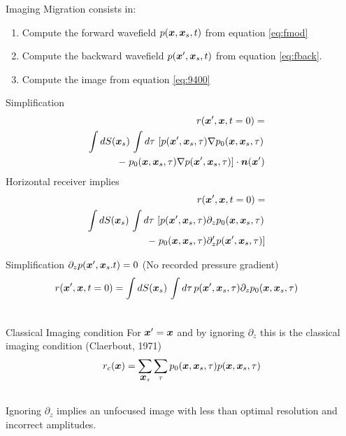 \documentclass[xcolor=dvipsnames,notes]{beamer}
\begin{document}
\begin{frame}{Imaging}
Migration consists in:
\begin{enumerate}
\item Compute the forward wavefield $p(\mbox{\boldmath $x$},\mbox{\boldmath $x$}_s,t)$
      from equation \eqref{eq:fmod}
\item Compute the backward wavefield $p(\mbox{\boldmath $x$}',\mbox{\boldmath $x$}_s,t)$ from equation \eqref{eq:fback}.
\item Compute the image from equation \eqref{eq:9400}
\end{enumerate}
\end{frame}
\begin{frame}{Simplification}
\begin{eqnarray}
 r(\mbox{\boldmath $x$}',\mbox{\boldmath $x$},t=0)=\nonumber\\
\int dS(\mbox{\boldmath $x$}_s)\, \int d\tau\, \left[p(\mbox{\boldmath $x$}',\mbox{\boldmath $x$}_s,\tau)\nabla p_0(\mbox{\boldmath $x$},\mbox{\boldmath $x$}_s,\tau)\right.\nonumber\\
   -\left. p_0(\mbox{\boldmath $x$},\mbox{\boldmath $x$}_s,\tau)\nabla p(\mbox{\boldmath $x$}',\mbox{\boldmath $x$}_s,\tau)\right]\cdot \mbox{\boldmath $n$}(\mbox{\boldmath $x$}')
&&                   \label{eq:10400}
\end{eqnarray}
Horizontal receiver implies
\begin{eqnarray}
 r(\mbox{\boldmath $x$}',\mbox{\boldmath $x$},t=0)=\nonumber\\
\int dS(\mbox{\boldmath $x$}_s)\, \int d\tau\, \left[p(\mbox{\boldmath $x$}',\mbox{\boldmath $x$}_s,\tau)\partial_z p_0(\mbox{\boldmath $x$},\mbox{\boldmath $x$}_s,\tau)\right.\nonumber\\
   -\left. p_0(\mbox{\boldmath $x$},\mbox{\boldmath $x$}_s,\tau)\partial_z' p(\mbox{\boldmath $x$}',\mbox{\boldmath $x$}_s,\tau)\right]
&&                   \label{eq:10500}
\end{eqnarray}
\end{frame}
\begin{frame}{Simplification}
$\partial_z p(\mbox{\boldmath $x$}',\mbox{\boldmath $x$}_s.t)=0$ (No recorded pressure gradient)
\begin{eqnarray}
 r(\mbox{\boldmath $x$}',\mbox{\boldmath $x$},t=0)=
\int dS(\mbox{\boldmath $x$}_s)\, \int d\tau\, p(\mbox{\boldmath $x$}',\mbox{\boldmath $x$}_s,\tau)\partial_z p_0(\mbox{\boldmath $x$},\mbox{\boldmath $x$}_s,\tau)\nonumber\\
&&                   \label{eq:10600}
\end{eqnarray}
\end{frame}
\begin{frame}{Classical Imaging condition}
For $\mbox{\boldmath $x$}'=\mbox{\boldmath $x$}$ and by ignoring $\partial_z$ this is the classical imaging condition (Claerbout, 1971)
\begin{eqnarray}
  r_{c}(\mbox{\boldmath $x$}) =
    \sum_{\mbox{\boldmath $x$}_s}\sum_{\tau}p_0(\mbox{\boldmath $x$},\mbox{\boldmath $x$}_s,\tau)p(\mbox{\boldmath $x$},\mbox{\boldmath $x$}_s,\tau)\nonumber\\ 
                                                 \nonumber
\end{eqnarray}
Ignoring $\partial_z$ implies an unfocused image with
less than optimal resolution and incorrect amplitudes.
\end{frame}
\end{document}
